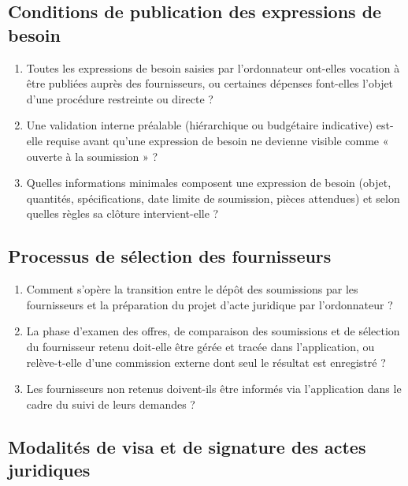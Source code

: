 \subsection{Conditions de publication des expressions de besoin}

\begin{enumerate}
  \item Toutes les expressions de besoin saisies par l'ordonnateur ont-elles vocation à être publiées auprès des fournisseurs, ou certaines dépenses font-elles l'objet d'une procédure restreinte ou directe ?
  \item Une validation interne préalable (hiérarchique ou budgétaire indicative) est-elle requise avant qu'une expression de besoin ne devienne visible comme « ouverte à la soumission » ?
  \item Quelles informations minimales composent une expression de besoin (objet, quantités, spécifications, date limite de soumission, pièces attendues) et selon quelles règles sa clôture intervient-elle ?
\end{enumerate}

\subsection{Processus de sélection des fournisseurs}

\begin{enumerate}
  \item Comment s'opère la transition entre le dépôt des soumissions par les fournisseurs et la préparation du projet d'acte juridique par l'ordonnateur ?
  \item La phase d'examen des offres, de comparaison des soumissions et de sélection du fournisseur retenu doit-elle être gérée et tracée dans l'application, ou relève-t-elle d'une commission externe dont seul le résultat est enregistré ?
  \item Les fournisseurs non retenus doivent-ils être informés via l'application dans le cadre du suivi de leurs demandes ?
\end{enumerate}

\subsection{Modalités de visa et de signature des actes juridiques}

